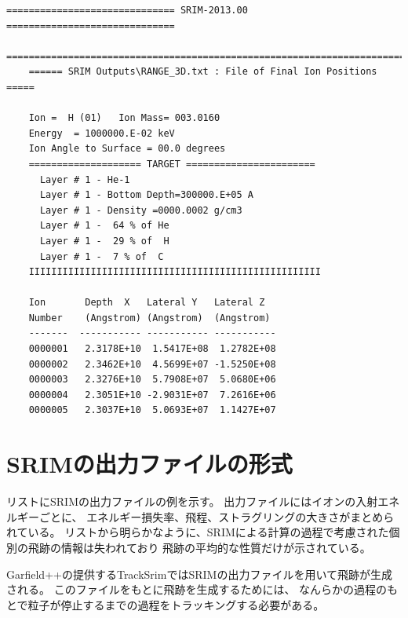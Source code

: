 \documentclass [11pt,a4paper,dvipdfmx] {jarticle}
\begin{document}
\begin{lstlisting}[caption={RANGE\_3D.txtの例。5イベントを抽出。},basicstyle=\fontsize{6}{6}\ttfamily,identifierstyle=\fontsize{6}{6},numberstyle={\tiny},columns=fixed]
    ============================== SRIM-2013.00 ==============================
    ==============================================================================
    ====== SRIM Outputs\RANGE_3D.txt : File of Final Ion Positions =====
    
    Ion =  H (01)   Ion Mass= 003.0160
    Energy  = 1000000.E-02 keV
    Ion Angle to Surface = 00.0 degrees
    ==================== TARGET =======================
      Layer # 1 - He-1
      Layer # 1 - Bottom Depth=300000.E+05 A
      Layer # 1 - Density =0000.0002 g/cm3
      Layer # 1 -  64 % of He
      Layer # 1 -  29 % of  H
      Layer # 1 -  7 % of  C
    IIIIIIIIIIIIIIIIIIIIIIIIIIIIIIIIIIIIIIIIIIIIIIIIIIII
                                                
    Ion       Depth  X   Lateral Y   Lateral Z  
    Number    (Angstrom) (Angstrom)  (Angstrom) 
    -------  ----------- ----------- -----------
    0000001   2.3178E+10  1.5417E+08  1.2782E+08
    0000002   2.3462E+10  4.5699E+07 -1.5250E+08
    0000003   2.3276E+10  5.7908E+07  5.0680E+06
    0000004   2.3051E+10 -2.9031E+07  7.2616E+06
    0000005   2.3037E+10  5.0693E+07  1.1427E+07
\end{lstlisting}

\section{SRIMの出力ファイルの形式}

リストにSRIMの出力ファイルの例を示す。
出力ファイルにはイオンの入射エネルギーごとに、
エネルギー損失率、飛程、ストラグリングの大きさがまとめられている。
リストから明らかなように、SRIMによる計算の過程で考慮された個別の飛跡の情報は失われており
飛跡の平均的な性質だけが示されている。

Garfield++の提供するTrackSrimではSRIMの出力ファイルを用いて飛跡が生成される。
このファイルをもとに飛跡を生成するためには、
なんらかの過程のもとで粒子が停止するまでの過程をトラッキングする必要がある。
\end{document}
